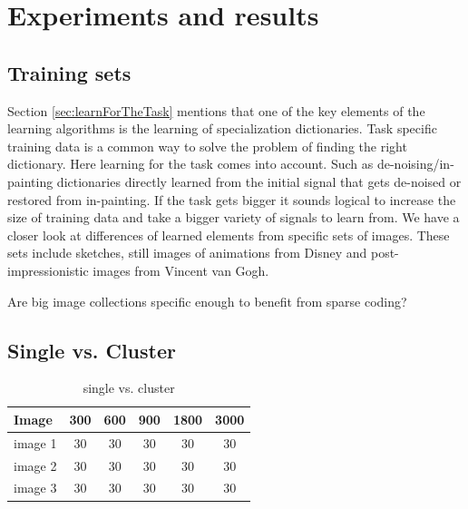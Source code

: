 \chapter{Experiments and results}
\section{Training sets}
Section \ref{sec:learnForTheTask} mentions that one of the key
elements of the learning algorithms is the learning of specialization
dictionaries. Task specific training data is a common way to solve the problem
of finding  the right dictionary. Here learning for the task comes into
account. Such as de-noising/in-painting dictionaries directly learned from the
initial signal that gets de-noised or restored from in-painting. If the task
gets bigger it sounds logical to increase the size of training data and take a
bigger variety of signals to learn from.  We have a closer look at differences
of learned elements from specific sets of images. These sets include sketches,
still images of animations from Disney and post-impressionistic images from
Vincent van Gogh.  

Are big image collections specific enough to benefit from sparse coding?




\section{Single vs. Cluster}
\begin{table}[h]
\caption{single vs. cluster}
\centering
\begin{tabular}{l c c c c c}
\hline\hline
Image & 300 & 600 & 900 & 1800 & 3000 \\
\hline
image 1 & 30 & 30 & 30 & 30 & 30 \\
image 2 & 30 & 30 & 30 & 30 & 30 \\
image 3 & 30 & 30 & 30 & 30 & 30 \\
\hline
\end{tabular}
\end{table}


